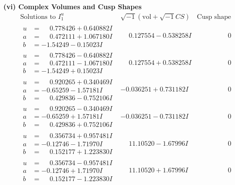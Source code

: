 \documentclass[1p]{elsarticle_modified}
\theoremstyle{definition}
\newcommand{\I}{\sqrt{-1}}
\begin{document}
\newpage\flushleft \textbf{(vi) Complex Volumes and Cusp Shapes}
$$\begin{array}{c|c|c}  
\text{Solutions to }I^u_{1}& \I (\text{vol} + \sqrt{-1}CS) & \text{Cusp shape}\\
 \hline 
\begin{aligned}
u &= \phantom{-}0.778426 + 0.640882 I \\
a &= \phantom{-}0.472111 + 1.067180 I \\
b &= -1.54249 - 0.15023 I\end{aligned}
 & \phantom{-}0.127554 - 0.538258 I & \phantom{-0.000000 } 0 \\ \hline\begin{aligned}
u &= \phantom{-}0.778426 - 0.640882 I \\
a &= \phantom{-}0.472111 - 1.067180 I \\
b &= -1.54249 + 0.15023 I\end{aligned}
 & \phantom{-}0.127554 + 0.538258 I & \phantom{-0.000000 } 0 \\ \hline\begin{aligned}
u &= \phantom{-}0.920265 + 0.340469 I \\
a &= -0.65259 - 1.57181 I \\
b &= \phantom{-}0.429836 - 0.752106 I\end{aligned}
 & -0.036251 + 0.731182 I & \phantom{-0.000000 } 0 \\ \hline\begin{aligned}
u &= \phantom{-}0.920265 - 0.340469 I \\
a &= -0.65259 + 1.57181 I \\
b &= \phantom{-}0.429836 + 0.752106 I\end{aligned}
 & -0.036251 - 0.731182 I & \phantom{-0.000000 } 0 \\ \hline\begin{aligned}
u &= \phantom{-}0.356734 + 0.957481 I \\
a &= -0.12746 - 1.71970 I \\
b &= \phantom{-}0.152177 + 1.223830 I\end{aligned}
 & \phantom{-}11.10520 - 1.67996 I & \phantom{-0.000000 } 0 \\ \hline\begin{aligned}
u &= \phantom{-}0.356734 - 0.957481 I \\
a &= -0.12746 + 1.71970 I \\
b &= \phantom{-}0.152177 - 1.223830 I\end{aligned}
 & \phantom{-}11.10520 + 1.67996 I & \phantom{-0.000000 } 0 \\ \hline\begin{aligned}

\end{aligned}
\end{array}$$
\end{document}
